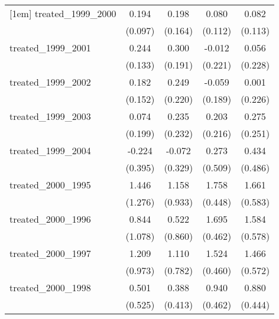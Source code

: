 {\begin{tabular}{l*{4}{c}}
[1em]
treated\_1999\_2000&       0.194\sym{*}  &       0.198         &       0.080         &       0.082         \\
            &     (0.097)         &     (0.164)         &     (0.112)         &     (0.113)         \\
[1em]
treated\_1999\_2001&       0.244         &       0.300         &      -0.012         &       0.056         \\
            &     (0.133)         &     (0.191)         &     (0.221)         &     (0.228)         \\
[1em]
treated\_1999\_2002&       0.182         &       0.249         &      -0.059         &       0.001         \\
            &     (0.152)         &     (0.220)         &     (0.189)         &     (0.226)         \\
[1em]
treated\_1999\_2003&       0.074         &       0.235         &       0.203         &       0.275         \\
            &     (0.199)         &     (0.232)         &     (0.216)         &     (0.251)         \\
[1em]
treated\_1999\_2004&      -0.224         &      -0.072         &       0.273         &       0.434         \\
            &     (0.395)         &     (0.329)         &     (0.509)         &     (0.486)         \\
[1em]
treated\_2000\_1995&       1.446         &       1.158         &       1.758\sym{***}&       1.661\sym{**} \\
            &     (1.276)         &     (0.933)         &     (0.448)         &     (0.583)         \\
[1em]
treated\_2000\_1996&       0.844         &       0.522         &       1.695\sym{***}&       1.584\sym{**} \\
            &     (1.078)         &     (0.860)         &     (0.462)         &     (0.578)         \\
[1em]
treated\_2000\_1997&       1.209         &       1.110         &       1.524\sym{***}&       1.466\sym{*}  \\
            &     (0.973)         &     (0.782)         &     (0.460)         &     (0.572)         \\
[1em]
treated\_2000\_1998&       0.501         &       0.388         &       0.940\sym{*}  &       0.880\sym{*}  \\
            &     (0.525)         &     (0.413)         &     (0.462)         &     (0.444)         \\

\end{tabular}}
